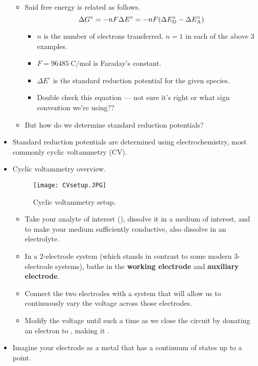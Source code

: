 \documentclass[../notes.tex]{subfiles}
\begin{document}
\begin{itemize}
\begin{itemize}
        \item Said free energy is related as follows.
        \begin{equation*}
            \Delta G^\circ = -nF\Delta E^\circ
            = -nF(\Delta E^\circ_{\ce{D}}-\Delta E^\circ_{\ce{A}})
        \end{equation*}
        \begin{itemize}
            \item $n$ is the number of electrons transferred. $n=1$ in each of the above 3 examples.
            \item $F=\SI[per-mode=symbol]{96485}{\coulomb\per\mole}$ is Faraday's constant.
            \item $\Delta E^\circ$ is the standard reduction potential for the given species.
            \item Double check this equation --- not sure it's right or what sign convention we're using??
        \end{itemize}
        \item But how do we determine standard reduction potentials?
    \end{itemize}
    \item Standard reduction potentials are determined using electrochemistry, most commonly cyclic voltammetry (CV).
    \pagebreak
    \item Cyclic voltammetry overview.
    \begin{figure}[h!]
        \centering
        \texttt{[image: CVsetup.JPG]}
        \caption{Cyclic voltammetry setup.}
        \label{fig:CVsetup}
    \end{figure}
    \begin{itemize}
        \item Take your analyte of interest (), dissolve it in a medium of interest, and to make your medium sufficiently conductive, also dissolve in an electrolyte.
        \item In a 2-electrode system (which stands in contrast to some modern 3-electrode systems), bathe in the \textbf{working electrode} and \textbf{auxiliary electrode}.
        \item Connect the two electrodes with a system that will allow us to continuously vary the voltage across those electrodes.
        \item Modify the voltage until such a time as we close the circuit by donating an electron to , making it .
    \end{itemize}
    \item Imagine your electrode as a metal that has a continuum of states up to a point.

\end{itemize}
\end{document}
